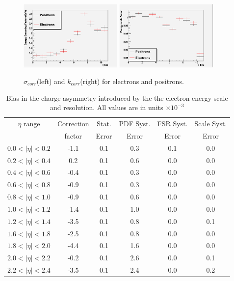 \begin{figure}[htbp]
  \begin{center}
\includegraphics*[width=0.45\textwidth]{ENSmeChargeSep.png}
\includegraphics*[width=0.45\textwidth]{ENKfactChargeSep.png}
 \caption{\label{Scale_sep} $\sigma_{corr}$(left) and $k_{corr}$(right) for electrons and positrons.}
\end{center}
\end{figure}

\begin{table}[htbp]
  \begin{center}
    \begin{tabular}{cccccc}
$\eta$ range & Correction  & Stat.   &PDF  Syst. &  FSR Syst. & Scale Syst.\\
          & factor & Error & Error   & Error  & Error  \\
     \hline
 $0.0<|\eta|<0.2$ & -1.1 & 0.1 & 0.3  &0.1 & 0.0\\
 $0.2<|\eta|<0.4$ &  0.2 & 0.1 & 0.6  &0.0 & 0.0\\
 $0.4<|\eta|<0.6$ & -0.4 & 0.1 & 0.3  &0.0 & 0.0\\
 $0.6<|\eta|<0.8$ & -0.9 & 0.1 & 0.3  &0.0 & 0.0\\
 $0.8<|\eta|<1.0$ & -0.9 & 0.1 & 0.6  &0.0 & 0.0\\
 $1.0<|\eta|<1.2$ & -1.4 & 0.1 & 1.0  &0.0 & 0.0\\
 $1.2<|\eta|<1.4$ & -3.5 & 0.1 & 0.8  &0.0 & 0.1\\
 $1.6<|\eta|<1.8$ & -2.5 & 0.1 & 0.8  &0.0 & 0.0\\
 $1.8<|\eta|<2.0$ & -4.4 & 0.1 & 1.6  &0.0 & 0.0\\
 $2.0<|\eta|<2.2$ & -0.2 & 0.1 & 2.6  &0.0 & 0.1\\
 $2.2<|\eta|<2.4$ & -3.5 & 0.1 & 2.4  &0.0 & 0.2\\
    \end{tabular}
    \caption{\label{tab:acc}Bias in the charge asymmetry introduced by the the electron energy scale and resolution.
 All values are in units $\times 10^{-3}$}
  \end{center}
\end{table}

